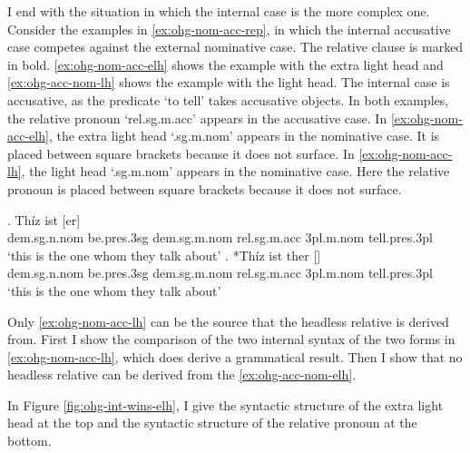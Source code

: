 I end with the situation in which the internal case is the more complex one.
Consider the examples in \ref{ex:ohg-nom-acc-rep}, in which the internal accusative case competes against the external nominative case. The relative clause is marked in bold. \ref{ex:ohg-nom-acc-elh} shows the example with the extra light head and \ref{ex:ohg-acc-nom-lh} shows the example with the light head.
The internal case is accusative, as the predicate  `to tell' takes accusative objects.
In both examples, the relative pronoun  `\ac{rel}.\ac{sg}.\ac{m}.\ac{acc}' appears in the accusative case.
In \ref{ex:ohg-nom-acc-elh}, the extra light head  `.\ac{sg}.\ac{m}.\ac{nom}' appears in the nominative case. It is placed between square brackets because it does not surface.
In \ref{ex:ohg-nom-acc-lh}, the light head  `.\ac{sg}.\ac{m}.\ac{nom}' appears in the nominative case. Here the relative pronoun is placed between square brackets because it does not surface.

\exg. Thíz ist [er]   \\
\ac{dem}.\ac{sg}.\ac{n}.\ac{nom} be.\ac{pres}.3\ac{sg}\scsub{[nom]} \ac{dem}.\ac{sg}.\ac{m}.\ac{nom} \ac{rel}.\ac{sg}.\ac{m}.\ac{acc} 3\ac{pl}.\ac{m}.\ac{nom} tell.\ac{pres}.3\ac{pl}\scsub{[acc]}\\
`this is the one whom they talk about' \label{ex:ohg-nom-acc-elh}
\exg. *Thíz ist ther []  \\
\ac{dem}.\ac{sg}.\ac{n}.\ac{nom} be.\ac{pres}.3\ac{sg}\scsub{[nom]} \ac{dem}.\ac{sg}.\ac{m}.\ac{nom} \ac{rel}.\ac{sg}.\ac{m}.\ac{acc} 3\ac{pl}.\ac{m}.\ac{nom} tell.\ac{pres}.3\ac{pl}\scsub{[acc]}\\
`this is the one whom they talk about' \label{ex:ohg-nom-acc-lh}

Only \ref{ex:ohg-nom-acc-lh} can be the source that the headless relative is derived from. First I show the comparison of the two internal syntax of the two forms in \ref{ex:ohg-nom-acc-lh}, which does derive a grammatical result. Then I show that no headless relative can be derived from the \ref{ex:ohg-acc-nom-elh}.

In Figure \ref{fig:ohg-int-wins-elh}, I give the syntactic structure of the extra light head at the top and the syntactic structure of the relative pronoun at the bottom.

